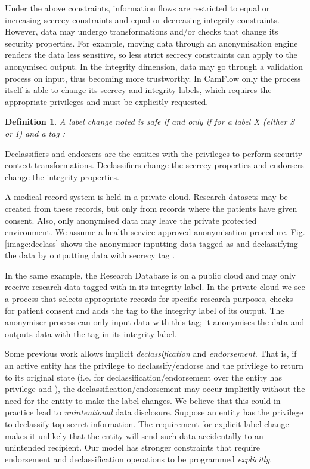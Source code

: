 \documentclass[10pt,journal,compsoc]{IEEEtran}
\newtheorem{definition}{Definition}
\begin{document}
Under the above constraints, information flows are restricted to equal or increasing secrecy constraints and equal or decreasing integrity constraints.
However, data may undergo transformations and/or checks that change its security properties.
For example, moving data through an anonymisation engine renders the data less sensitive, so less strict secrecy constraints can apply to the anonymised output. 
In the integrity dimension, data may go through a validation process on input, thus becoming more trustworthy.
In CamFlow 
only the process itself is able to change its secrecy and integrity labels, which requires the appropriate privileges and must be explicitly requested. 


\begin{definition}
\label{def:label_change}
A label change noted  is safe if and only if for a label X (either S or I) and a tag :

\end{definition}


Declassifiers and endorsers are the entities with the privileges to perform security context transformations. Declassifiers change the secrecy properties and endorsers change the integrity properties.


A medical record system is held in a private cloud. Research datasets may be created from these records, but only from records where the patients have given consent. Also, only anonymised data may leave the private protected environment. We assume a health service approved anonymisation procedure. Fig. \ref{image:declass} shows the anonymiser inputting data tagged as  and declassifying the data by outputting data with secrecy tag 
. 

In the same example, the Research Database is on a public cloud and may only receive research data  tagged with  in its integrity label. In the private cloud we see a process that selects appropriate records for specific research purposes, checks for patient consent and adds the tag  to the integrity label of its output. The anonymiser process can only input data with this tag; it anonymises the data and outputs data with the tag   in its integrity label.



Some previous work \cite{Krohn:2007:IFC:1294261.1294293, porter2014practical} allows implicit \emph{declassification} and \emph{endorsement}. That is, if an active entity has the privilege to declassify/endorse and the privilege to return to its original state (i.e. for declassification\slash endorsement over  the entity has privilege  and ), the declassification/endorsement may occur implicitly without the need for the entity to make the label changes. 
We believe that this could in practice lead to 
\emph{unintentional} data disclosure. Suppose an entity has the privilege to declassify top-secret information. The requirement for explicit label change makes it unlikely that the entity will send such data accidentally to an unintended recipient. 
Our model has stronger constraints that require endorsement and declassification operations to be programmed \emph{explicitly}.
\end{document}

